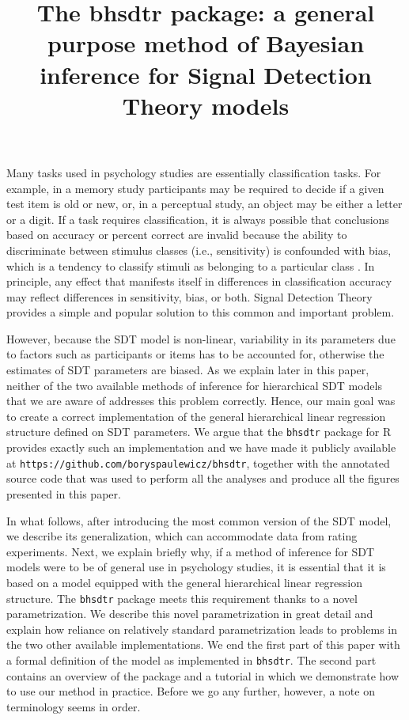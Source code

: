 \documentclass[a4paper,man,apacite,floatsintext]{apa6}
\title{The bhsdtr package: a general purpose method of Bayesian
  inference for Signal Detection Theory models}
\newcommand{\code}[1]{\texttt{#1}}
\begin{document}
\maketitle
Many tasks used in psychology studies are essentially classification
tasks. For example, in a memory study participants may be required to
decide if a given test item is old or new, or, in a perceptual study,
an object may be either a letter or a digit. If a task requires
classification, it is always possible that conclusions based on
accuracy or percent correct are invalid because the ability to
discriminate between stimulus classes (i.e., sensitivity) is
confounded with bias, which is a tendency to classify stimuli as
belonging to a particular class \cite{GreenSwets66}. In principle, any
effect that manifests itself in differences in classification accuracy
may reflect differences in sensitivity, bias, or both. Signal
Detection Theory provides a simple and popular solution to this common
and important problem.

However, because the SDT model is non-linear, variability in its
parameters due to factors such as participants or items has to be
accounted for, otherwise the estimates of SDT parameters are
biased. As we explain later in this paper, neither of the two
available methods of inference for hierarchical SDT models that we are
aware of addresses this problem correctly. Hence, our main goal was to
create a correct implementation of the general hierarchical linear
regression structure defined on SDT parameters. We argue that the
\code{bhsdtr} package for R \cite{rstatistical} provides exactly such
an implementation and we have made it publicly available at
\code{https://github.com/boryspaulewicz/bhsdtr}, together with the
annotated source code that was used to perform all the analyses and
produce all the figures presented in this paper.

In what follows, after introducing the most common version of the SDT
model, we describe its generalization, which can accommodate data from
rating experiments. Next, we explain briefly why, if a method of
inference for SDT models were to be of general use in psychology
studies, it is essential that it is based on a model equipped with the
general hierarchical linear regression structure. The \code{bhsdtr}
package meets this requirement thanks to a novel parametrization. We
describe this novel parametrization in great detail and explain how
reliance on relatively standard parametrization leads to problems in
the two other available implementations. We end the first part of this
paper with a formal definition of the model as implemented in
\code{bhsdtr}. The second part contains an overview of the package and
a tutorial in which we demonstrate how to use our method in
practice. Before we go any further, however, a note on terminology
seems in order.
\end{document}
